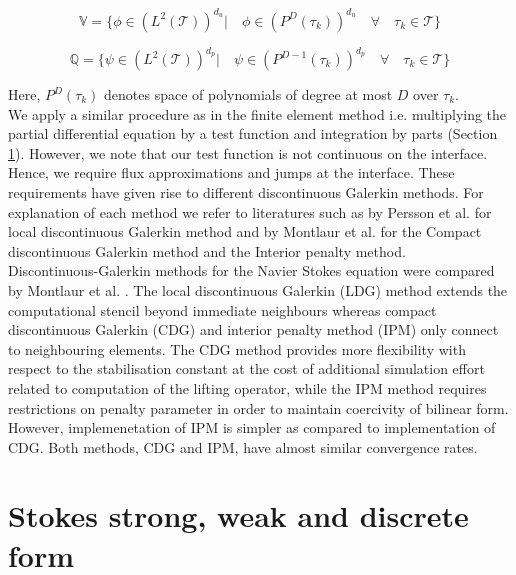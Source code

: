 \documentclass[a4paper,oneside,openright,spanish,english]{book}
\begin{document}
\begin{equation} \label{velocity_test}
\mathbb{V} = \lbrace \phi \in (L^2(\mathcal{T}))^{d_u}| \quad \phi \in (P^D(\tau_k))^{d_u} \quad \forall \quad {\tau_k} \in \mathcal{T} \rbrace
\end{equation}

\begin{equation} \label{pressure_test}
\mathbb{Q} = \lbrace \psi \in (L^2(\mathcal{T}))^{d_p}| \quad \psi \in (P^{D-1}(\tau_k))^{d_p} \quad \forall \quad {\tau_k} \in \mathcal{T} \rbrace
\end{equation}

Here, $P^D(\tau_k)$ denotes space of polynomials of degree at most $D$ over $\tau_k$.\\

We apply a similar procedure as in the finite element method i.e. multiplying the partial differential equation by a test function and integration by parts (Section \ref{Stokes_flow_ch3}). However, we note that our test function is not continuous on the interface. Hence, we require flux approximations and jumps at the interface. These requirements have given rise to different discontinuous Galerkin methods. For explanation of each method we refer to literatures such as by Persson et al. \cite{persson} for local discontinuous Galerkin method and by Montlaur et al. \cite{Montlaur} for the Compact discontinuous Galerkin method and the Interior penalty method. \\

Discontinuous-Galerkin methods for the Navier Stokes equation were compared by Montlaur et al. \cite{Montlaur}. The local discontinuous Galerkin (LDG) method extends the computational stencil beyond immediate neighbours whereas compact discontinuous Galerkin (CDG) and interior penalty method (IPM) only connect to neighbouring elements. The CDG method provides more flexibility with respect to the stabilisation constant at the cost of additional simulation effort related to computation of the lifting operator, while the IPM method requires restrictions on penalty parameter in order to maintain coercivity of bilinear form. However, implemenetation of IPM is simpler as compared to implementation of CDG. Both methods, CDG and IPM, have almost similar convergence rates. 

\section{Stokes strong, weak and discrete form} \label{Stokes_flow_ch3}
\end{document}
